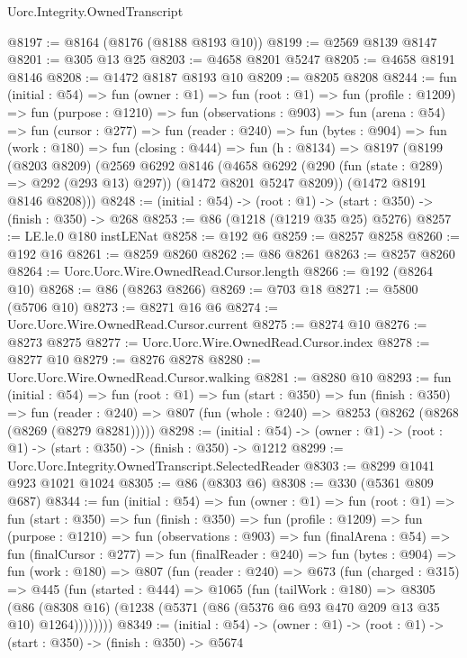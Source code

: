 \begin{lexlean}{Uorc.Integrity.OwnedTranscript}
\begin{coremodule}
@8197 := @8164 (@8176 (@8188 @8193 @10))
@8199 := @2569 @8139 @8147
@8201 := @305 @13 @25
@8203 := @4658 @8201 @5247
@8205 := @4658 @8191 @8146
@8208 := @1472 @8187 @8193 @10
@8209 := @8205 @8208
@8244 := fun (initial : @54) =>
  fun (owner : @1) =>
  fun (root : @1) =>
  fun (profile : @1209) =>
  fun (purpose : @1210) =>
  fun (observations : @903) =>
  fun (arena : @54) =>
  fun (cursor : @277) =>
  fun (reader : @240) =>
  fun (bytes : @904) =>
  fun (work : @180) =>
  fun (closing : @444) =>
  fun (h : @8134) =>
  @8197
    (@8199
      (@8203 @8209)
      (@2569
        @6292
        @8146
        (@4658 @6292 (@290 (fun (state : @289) => @292 (@293 @13) @297)) (@1472 @8201 @5247 @8209))
        (@1472 @8191 @8146 @8208)))
@8248 := (initial : @54) -> (root : @1) -> (start : @350) -> (finish : @350) -> @268
@8253 := @86 (@1218 (@1219 @35 @25) @5276)
@8257 := LE.le.{0} @180 instLENat
@8258 := @192 @6
@8259 := @8257 @8258
@8260 := @192 @16
@8261 := @8259 @8260
@8262 := @86 @8261
@8263 := @8257 @8260
@8264 := Uorc.Uorc.Wire.OwnedRead.Cursor.length
@8266 := @192 (@8264 @10)
@8268 := @86 (@8263 @8266)
@8269 := @703 @18
@8271 := @5800 (@5706 @10)
@8273 := @8271 @16 @6
@8274 := Uorc.Uorc.Wire.OwnedRead.Cursor.current
@8275 := @8274 @10
@8276 := @8273 @8275
@8277 := Uorc.Uorc.Wire.OwnedRead.Cursor.index
@8278 := @8277 @10
@8279 := @8276 @8278
@8280 := Uorc.Uorc.Wire.OwnedRead.Cursor.walking
@8281 := @8280 @10
@8293 := fun (initial : @54) =>
  fun (root : @1) =>
  fun (start : @350) =>
  fun (finish : @350) =>
  fun (reader : @240) => @807 (fun (whole : @240) => @8253 (@8262 (@8268 (@8269 (@8279 @8281)))))
@8298 := (initial : @54) ->
  (owner : @1) -> (root : @1) -> (start : @350) -> (finish : @350) -> @1212
@8299 := Uorc.Uorc.Integrity.OwnedTranscript.SelectedReader
@8303 := @8299 @1041 @923 @1021 @1024
@8305 := @86 (@8303 @6)
@8308 := @330 (@5361 @809 @687)
@8344 := fun (initial : @54) =>
  fun (owner : @1) =>
  fun (root : @1) =>
  fun (start : @350) =>
  fun (finish : @350) =>
  fun (profile : @1209) =>
  fun (purpose : @1210) =>
  fun (observations : @903) =>
  fun (finalArena : @54) =>
  fun (finalCursor : @277) =>
  fun (finalReader : @240) =>
  fun (bytes : @904) =>
  fun (work : @180) =>
  @807
    (fun (reader : @240) =>
    @673
      (fun (charged : @315) =>
      @445
        (fun (started : @444) =>
        @1065
          (fun (tailWork : @180) =>
          @8305
            (@86 (@8308 @16) (@1238 (@5371 (@86 (@5376 @6 @93 @470 @209 @13 @35 @10) @1264))))))))
@8349 := (initial : @54) ->
  (owner : @1) -> (root : @1) -> (start : @350) -> (finish : @350) -> @5674

\end{coremodule}
\end{lexlean}
